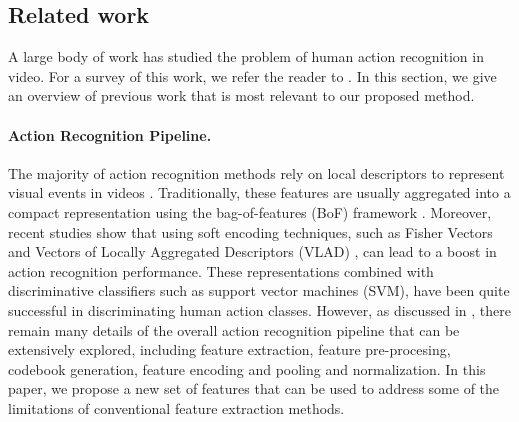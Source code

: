 \documentclass[runningheads]{llncs}
\begin{document}
\subsection*{Related work}\label{subsec: related work}
A large body of work has studied the problem of human action recognition in video. For a survey of this work, we refer the reader to \cite{aggarwal2011}. In this section, we give an overview of previous work that is most relevant to our proposed method.

\paragraph{Action Recognition Pipeline.} The majority of action recognition methods rely on local descriptors to represent visual events in videos \cite{laptev2005,dollar2005,wang2011}. Traditionally, these features are usually aggregated into a compact representation using the bag-of-features (BoF) framework \cite{laptev2008, escorcia2013}. Moreover, recent studies show that using soft encoding techniques, such as  Fisher Vectors \cite{perronnin2010} and Vectors of Locally Aggregated Descriptors (VLAD) \cite{jegou2012}, can lead to a boost in action recognition performance. These representations combined with discriminative classifiers such as support vector machines (SVM), have been quite successful in discriminating human action classes. However, as discussed in \cite{xwang2013}, there remain many details of the overall action recognition pipeline that can be extensively explored, including feature extraction, feature pre-procesing, codebook generation, feature encoding and pooling and normalization. In this paper, we propose a new set of features that can be used to address some of the limitations of conventional feature extraction methods.
\end{document}
